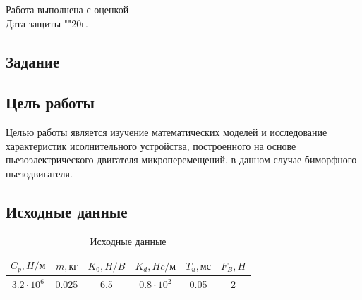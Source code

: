 \documentclass[a4paper, 12pt]{article}
\begin{document}
\begin{titlepage}
		Работа выполнена с оценкой \hspace{1cm} \underline{\hspace{8cm}} \\ 
		\vspace{1cm}
		Дата защиты "\underline{\hspace{0.7cm}}"\hspace{0.2cm}\underline{\hspace{2cm}}\hspace{0.2cm}20\underline{\hspace{0.7cm}}г.

\end{titlepage}

\begin{center}
\section*{Задание}
\end{center}
\subsection*{Цель работы}
Целью работы является изучение математических моделей и исследование характеристик исолнительного устройства, построенного на основе пьезоэлектрического двигателя микроперемещений, в данном случае биморфного пьезодвигателя.


\subsection*{Исходные данные}
\begin{table}[h!]
	\centering
	\begin{threeparttable}
	\caption{Исходные данные}\label{tab:perflogcross}
	\begin{tabular}{|c|c|c|c|c|c|}
		\hline
		$C_p,H/\text{м}$ & $m,\text{кг}$ & $K_0,H/B$ & $K_d,Hc/\text{м}$ & $T_u,\text{мс}$ & $F_B,H$\\
		\hline
		$3.2\cdot 10^6$ & 0.025 & 6.5 & $0.8\cdot 10^2$ & 0.05 & 2\\
		\hline
	\end{tabular}
	\end{threeparttable}
\end{table}

\newpage
\end{document}
